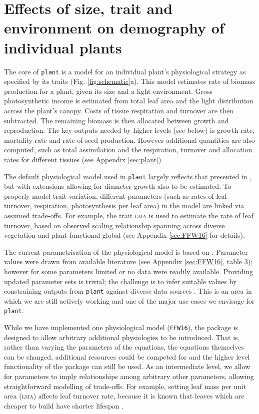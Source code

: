 \documentclass[a4paper,11pt]{article}
\newcommand{\plant}{\texttt{plant}}
\begin{document}
\section{Effects of size, trait and environment on demography of individual plants}

The core of {\plant} is a model for an individual plant's
physiological strategy as specified by its traits
(Fig. \ref{fig:schematic}a). This model estimates rate of biomass
production for a plant, given its size and a light environment. Gross
photosynthetic income is estimated from total leaf area and the light
distribution across the plant's canopy. Costs of tissue respiration
and turnover are then subtracted. The remaining biomass is then
allocated between growth and reproduction.  
The key outputs needed by higher levels (see below) is growth rate,
mortality rate and rate of seed production.  However additional
quantities are also computed, such as total assimilation and the
respiration, turnover and allocation rates for different tissues (see
Appendix \ref{sec:plant})

The default physiological model used in {\plant} largely reflects that
presented in \citet{Falster-2011}, but with extensions allowing for
diameter growth also to be estimated. To properly model trait
variation, different parameters (such as rates of leaf turnover,
respiration, photosynthesis per leaf area) in the model are linked via
assumed trade-offs. For example, the trait \textsc{lma} is used to estimate the
rate of leaf turnover, based on observed scaling relationship spanning
across diverse vegetation and plant functional global
\citep{Wright-2004} (see Appendix \ref{sec:FFW16} for details).

The current parametrisation of the physiological model is based on
\citet{Falster-2011}. Parameter values were drawn from available
literature (see Appendix \ref{sec:FFW16}, table 3); however for some
parameters limited or no data were readily available. Providing
updated parameter sets is trivial; the challenge is to infer suitable
values by constraining outputs from {\plant} against diverse data
sources \citep{Lebauer-2012, Keenan-2013}. This is an area in which we
are still actively working and one of the major use cases we envisage
for {\plant}.

While we have implemented one physiological model (\texttt{FFW16}),
the package is designed to allow arbitrary additional physiologies to
be introduced.  That is, rather than varying the parameters of the
equations, the equations themselves can be changed, additional
resources could be competed for and the higher level functionality of
the package can still be used.  As an intermediate level, we allow for
parameters to imply relationships among arbitrary other parameters,
allowing straightforward modelling of trade-offs.  For example,
setting leaf mass per unit area (\textsc{lma}) affects leaf turnover rate,
because it is known that leaves which are cheaper to build have shorter 
lifespan \citep{Wright-2004}.
\end{document}
